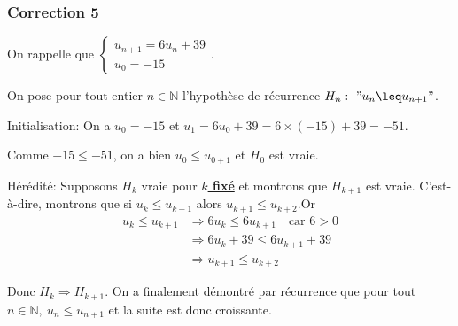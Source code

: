 \documentclass[15pt, mathserif]{beamer}
\begin{document}
\begin{frame}
\vspace{-10mm}
	\frametitle{Correction 5}
\vspace{6.5mm}

On rappelle que $\begin{cases} u_{n+1} = 6u_n+39\\ u_0 = -15\end{cases}$.

\medskip

 On pose pour tout entier $n \in \mathbb{N}$ l'hypothèse de récurrence $H_n:~"u_n  \leq u_{n+1}"$.

\medskip

Initialisation: On a $u_0 =-15$ et $u_1 = 6u_0+39= 6\times\left(-15\right)+39=-51$.

 Comme $-15 \leq -51$, on a bien $u_0  \leq u_{0+1}$ et $H_0$ est vraie.

\medskip

Hérédité: Supposons $H_k$ vraie pour \textbf\underline{{$k$ fixé}} et montrons que $H_{k+1}$ est vraie. C'est-à-dire, montrons que si $u_k  \leq u_{k+1}$ alors $u_{k+1}  \leq u_{k+2}$.Or \begin{align*} u_k  \leq u_{k+1} &\Rightarrow 6u_k \leq 6u_{k+1}\quad \text{car } 6>0\\
	 &\Rightarrow6u_k+39 \leq 6u_{k+1}+39\\
	 &\Rightarrow u_{k+1}  \leq u_{k+2}
\end{align*}

Donc $H_{k} \Rightarrow H_{k+1}$. On a finalement démontré par récurrence que pour tout $n \in\mathbb{N},~ u_n \leq u_{n+1}$ et la suite est donc croissante.\end{frame}
\end{document}
